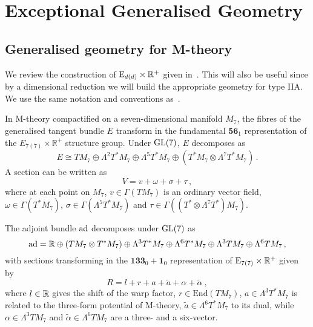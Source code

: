 \documentclass[debug]{phd}
\begin{document}
	\chapter{Exceptional Generalised Geometry}
	\label{app:EGG}
		\section{Generalised geometry for M-theory}\label{appsec:EGGMth}
			We review the construction of $\mathrm{E}_{d(d)} \times \mathbb{R}^+$ given in~\cite{hull1, waldram2, waldram4}.
			This will also be useful since by a dimensional reduction we will build the appropriate geometry for type IIA.
			We use the same notation and conventions as~\cite{waldram2, waldram4}. 
			
			In M-theory compactified on a seven-dimensional manifold $M_7$, the fibres of the generalised tangent bundle $E$ transform in the fundamental $\mathbf{56}_1$ representation of the $E_{7(7)}\times\mathbb R^+$ structure group. 
			Under $\mathrm{GL}(7)$, $E$ decomposes as
					\begin{equation}\label{gense7}
 						E \cong TM_7 \oplus \Lambda^2T^*M_7 \oplus \Lambda^5T^*M_7 \oplus (T^*M_7\otimes\Lambda^7T^*M_7)\, .
					\end{equation} 
			A section can be written as 
					\begin{equation}
 						V = v + \omega + \sigma + \tau\, ,
					\end{equation}
			where at each point on $M_7$, $v \in \Gamma(TM_7)$ is an ordinary vector field, $\omega\in \Gamma(T^*M_7)$, $\sigma \in \Gamma(\Lambda^5T^*M_7)$ and $\tau \in \Gamma((T^*\otimes \Lambda^7 T^*)M_7)$.
			
			The adjoint bundle $\mathrm{ad}$ decomposes under $\mathrm{GL}(7)$ as
					\begin{equation}
						\operatorname{ad} = \mathbb{R} \oplus (TM_7\otimes T^*M_7) \oplus \Lambda^3 T^*M_7 \oplus \Lambda^6 T^*M_7 \oplus \Lambda^3 TM_7 \oplus \Lambda^6 TM_7 \, ,
					\end{equation}
			with sections transforming in the $\mathbf{133}_0+ \mathbf{1}_0$ representation of $\mathrm{E}_{7(7)}\times \mathbb{R}^+$ given by
					\begin{equation}\label{eq:Radj}
						R = l + r + a + \tilde a + \alpha + \tilde\alpha \ ,
					\end{equation}
			where $l \in \mathbb{R}$ gives the shift of the warp factor, $r \in \mathrm{End}(T M_7)$, $a \in \Lambda^3 T^*M_7$ is related to the three-form potential of M-theory, $\tilde a \in \Lambda^6T^*M_7$ to its dual, while $\alpha \in \Lambda^3 TM_7$ and $ \tilde\alpha \in \Lambda^6 TM_7$ are a three- and a six-vector.
				
\end{document}
